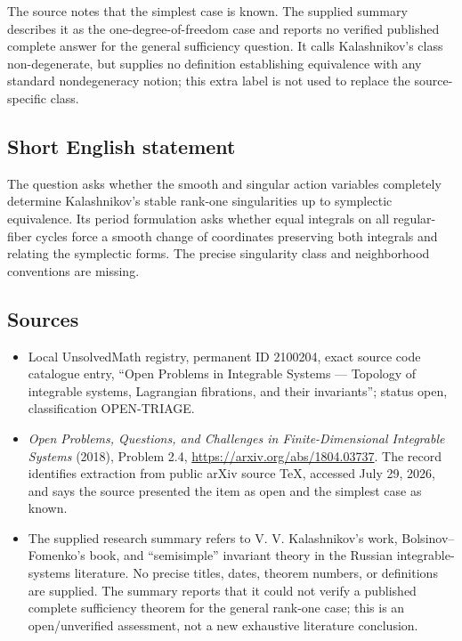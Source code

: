 \documentclass[11pt]{article}
\begin{document}
The source notes that the simplest case is known. The supplied summary describes it as the one-degree-of-freedom case and reports no verified published complete answer for the general sufficiency question. It calls Kalashnikov's class non-degenerate, but supplies no definition establishing equivalence with any standard nondegeneracy notion; this extra label is not used to replace the source-specific class.
\subsection{Short English statement}
The question asks whether the smooth and singular action variables completely determine Kalashnikov's stable rank-one singularities up to symplectic equivalence. Its period formulation asks whether equal integrals on all regular-fiber cycles force a smooth change of coordinates preserving both integrals and relating the symplectic forms. The precise singularity class and neighborhood conventions are missing.
\subsection{Sources}
\begin{itemize}
\item Local UnsolvedMath registry, permanent ID 2100204, exact source code catalogue entry, ``Open Problems in Integrable Systems --- Topology of integrable systems, Lagrangian fibrations, and their invariants''; status open, classification OPEN-TRIAGE.
\item \emph{Open Problems, Questions, and Challenges in Finite-Dimensional Integrable Systems} (2018), Problem 2.4, \url{https://arxiv.org/abs/1804.03737}. The record identifies extraction from public arXiv source TeX, accessed July 29, 2026, and says the source presented the item as open and the simplest case as known.
\item The supplied research summary refers to V. V. Kalashnikov's work, Bolsinov--Fomenko's book, and ``semisimple'' invariant theory in the Russian integrable-systems literature. No precise titles, dates, theorem numbers, or definitions are supplied. The summary reports that it could not verify a published complete sufficiency theorem for the general rank-one case; this is an open/unverified assessment, not a new exhaustive literature conclusion.
\end{itemize}
\end{document}
